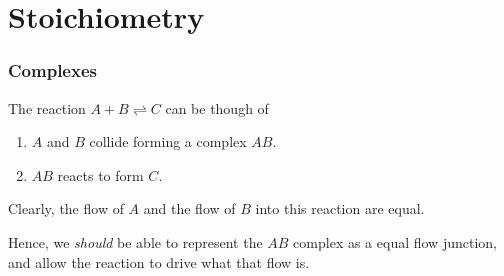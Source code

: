 \documentclass[10pt,reqno]{beamer}
\begin{document}
\section{Stoichiometry}
\begin{frame}
\frametitle{Complexes}
The reaction $A + B \rightleftharpoons C$ can be though of
\begin{enumerate}
	\item $A$ and $B$ collide forming a complex $AB$.
	\item $AB$ reacts to form $C$. 
\end{enumerate}
\vfill

Clearly, the flow of $A$ and the flow of $B$ into this reaction are equal.
\vfill

Hence, we \emph{should} be able to represent the $AB$ complex as a equal flow junction, and allow the reaction to drive what that flow is.
\end{frame}
\end{document}

